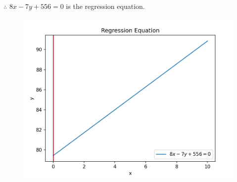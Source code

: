 \documentclass[journal,12pt,twocolumn]{IEEEtran}
\begin{document}
$\therefore$ $8x-7y+556=0$ is the regression equation.

\begin{figure}[h!]
    \centering
    \includegraphics[width=\columnwidth]{figs/Asg2.png}
    \label{regeq}
\end{figure}
\end{document}
